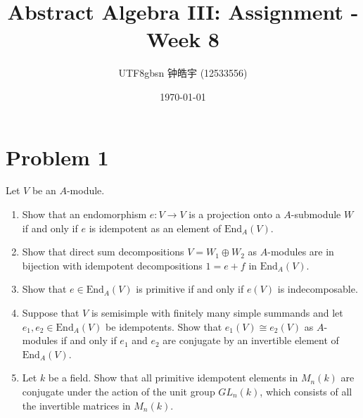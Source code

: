 \documentclass[12pt, a4paper]{article}
\title{Abstract Algebra III: Assignment - Week 8}
\author{
    \begin{CJK*}{UTF8}{gbsn}
    钟皓宇 (12533556)
    \end{CJK*}
}
\date{\today}
\theoremstyle{remark}
\begin{document}
\maketitle

\section*{Problem 1}
Let $V$ be an $A$-module.
\begin{enumerate}
    \item[(a)] Show that an endomorphism $e : V \to V$ is a projection onto a $A$-submodule $W$ if and only if $e$ is idempotent as an element of $\text{End}_A(V)$.
    \item[(b)] Show that direct sum decompositions $V = W_1 \oplus W_2$ as $A$-modules are in bijection with idempotent decompositions $1 = e + f$ in $\text{End}_A(V)$.
    \item[(c)] Show that $e \in \text{End}_A(V)$ is primitive if and only if $e(V)$ is indecomposable.
    \item[(d)] Suppose that $V$ is semisimple with finitely many simple summands and let $e_1, e_2 \in \text{End}_A(V)$ be idempotents. Show that $e_1(V) \cong e_2(V)$ as $A$-modules if and only if $e_1$ and $e_2$ are conjugate by an invertible element of $\text{End}_A(V)$.
    \item[(e)] Let $k$ be a field. Show that all primitive idempotent elements in $M_n(k)$ are conjugate under the action of the unit group $GL_n(k)$, which consists of all the invertible matrices in $M_n(k)$.
\end{enumerate}
\end{document}
